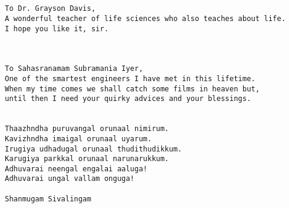 \begin{minipage}{4in}

\begin{verbatim}


To Dr. Grayson Davis,
A wonderful teacher of life sciences who also teaches about life.
I hope you like it, sir.



To Sahasranamam Subramania Iyer,
One of the smartest engineers I have met in this lifetime.
When my time comes we shall catch some films in heaven but,
until then I need your quirky advices and your blessings.


Thaazhndha puruvangal orunaal nimirum.
Kavizhndha imaigal orunaal uyarum.
Irugiya udhadugal orunaal thudithudikkum.
Karugiya parkkal orunaal narunarukkum.
Adhuvarai neengal engalai aaluga!
Adhuvarai ungal vallam onguga!

Shanmugam Sivalingam

\end{verbatim}


\end{minipage}
